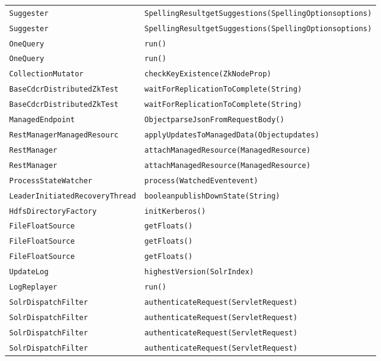 \begin{center}
\begin{longtable}{ll}
\lstinline/Suggester/&{\lstinline/SpellingResultgetSuggestions(SpellingOptionsoptions)/}\\
\lstinline/Suggester/&{\lstinline/SpellingResultgetSuggestions(SpellingOptionsoptions)/}\\
\lstinline/OneQuery/&{\lstinline/run()/}\\
\lstinline/OneQuery/&{\lstinline/run()/}\\
\lstinline/CollectionMutator/&{\lstinline/checkKeyExistence(ZkNodeProp)/}\\
\lstinline/BaseCdcrDistributedZkTest/&{\lstinline/waitForReplicationToComplete(String)/}\\
\lstinline/BaseCdcrDistributedZkTest/&{\lstinline/waitForReplicationToComplete(String)/}\\
\lstinline/ManagedEndpoint/&{\lstinline/ObjectparseJsonFromRequestBody()/}\\
\lstinline/RestManagerManagedResourc/&{\lstinline/applyUpdatesToManagedData(Objectupdates)/}\\
\lstinline/RestManager/&{\lstinline/attachManagedResource(ManagedResource)/}\\
\lstinline/RestManager/&{\lstinline/attachManagedResource(ManagedResource)/}\\
\lstinline/ProcessStateWatcher/&{\lstinline/process(WatchedEventevent)/}\\
\lstinline/LeaderInitiatedRecoveryThread/&{\lstinline/booleanpublishDownState(String)/}\\
\lstinline/HdfsDirectoryFactory/&{\lstinline/initKerberos()/}\\
\lstinline/FileFloatSource/&{\lstinline/getFloats()/}\\
\lstinline/FileFloatSource/&{\lstinline/getFloats()/}\\
\lstinline/FileFloatSource/&{\lstinline/getFloats()/}\\
\lstinline/UpdateLog/&{\lstinline/highestVersion(SolrIndex)/}\\
\lstinline/LogReplayer/&{\lstinline/run()/}\\
\lstinline/SolrDispatchFilter/&{\lstinline/authenticateRequest(ServletRequest)/}\\
\lstinline/SolrDispatchFilter/&{\lstinline/authenticateRequest(ServletRequest)/}\\
\lstinline/SolrDispatchFilter/&{\lstinline/authenticateRequest(ServletRequest)/}\\
\lstinline/SolrDispatchFilter/&{\lstinline/authenticateRequest(ServletRequest)/}\\

\end{longtable}
\end{center}
